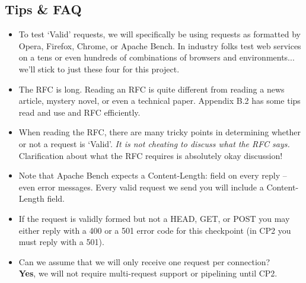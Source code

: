 \subsection{Tips \& FAQ}
    \begin{itemize}
      \item To test `Valid' requests, we will specifically be using requests as formatted by Opera, Firefox, Chrome, or Apache Bench. In industry folks test web services on a tens or even hundreds of combinations of browsers and environments... we'll stick to just these four for this project.
    
      \item The RFC is long.  Reading an RFC is quite different from reading a news article, mystery novel, or even a technical paper.
Appendix B.2 has some tips read and use and RFC efficiently.

      \item When reading the RFC, there are many tricky points in determining whether or not a request is `Valid'. 
          {\it It is not cheating to discuss what the RFC says.} Clarification about what the RFC requires is absolutely okay discussion!  

      \item Note that Apache Bench expects a Content-Length: field on every reply -- even error messages. Every valid request we send you will include a Content-Length field.

      \item If the request is validly formed but not a HEAD, GET, or POST you may either reply with a 400 or a 501 error code for this checkpoint (in CP2 you must reply with a 501).
  
      \item Can we assume that we will only receive one request per connection?\\
        {\bf Yes}, we will not require multi-request support or pipelining until CP2.
    \end{itemize}

\newpage
